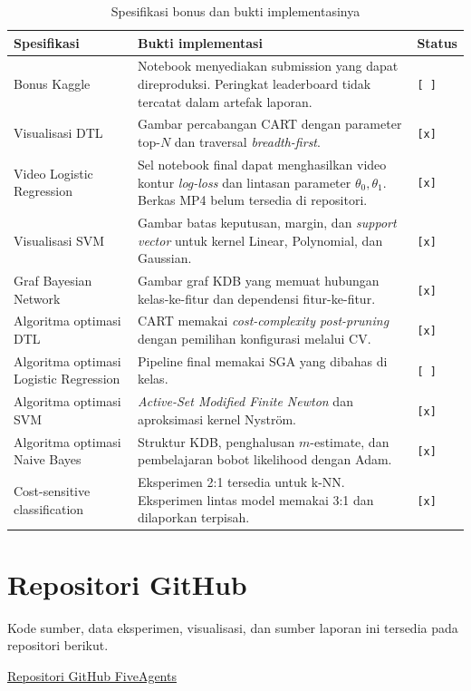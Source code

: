 \begin{table}[H]
    \centering
    \small
    \caption{Spesifikasi bonus dan bukti implementasinya}
    \label{tab:lampiran-bonus-specification-status}
    \begin{tabular}{p{}p{}p{}}
        \toprule
        Spesifikasi                            & Bukti implementasi                                                                                                   & Status       \\
        \midrule
        Bonus Kaggle                           & Notebook menyediakan submission yang dapat direproduksi. Peringkat leaderboard tidak tercatat dalam artefak laporan. & \texttt{[ ]} \\
        Visualisasi DTL                        & Gambar percabangan CART dengan parameter top-$N$ dan traversal \textit{breadth-first}.                               & \texttt{[x]} \\
        Video Logistic Regression              & Sel notebook final dapat menghasilkan video kontur \textit{log-loss} dan lintasan parameter $\theta_0,\theta_1$. Berkas MP4 belum tersedia di repositori. & \texttt{[x]} \\
        Visualisasi SVM                        & Gambar batas keputusan, margin, dan \textit{support vector} untuk kernel Linear, Polynomial, dan Gaussian.           & \texttt{[x]} \\
        Graf Bayesian Network                  & Gambar graf KDB yang memuat hubungan kelas-ke-fitur dan dependensi fitur-ke-fitur.                                   & \texttt{[x]} \\
        Algoritma optimasi DTL                 & CART memakai \textit{cost-complexity post-pruning} dengan pemilihan konfigurasi melalui CV.                          & \texttt{[x]} \\
        Algoritma optimasi Logistic Regression & Pipeline final memakai SGA yang dibahas di kelas.                                                                    & \texttt{[ ]} \\
        Algoritma optimasi SVM                 & \textit{Active-Set Modified Finite Newton} dan aproksimasi kernel Nystr\"om.                                         & \texttt{[x]} \\
        Algoritma optimasi Naive Bayes         & Struktur KDB, penghalusan $m$-estimate, dan pembelajaran bobot likelihood dengan Adam.                               & \texttt{[x]} \\
        Cost-sensitive classification          & Eksperimen 2:1 tersedia untuk k-NN. Eksperimen lintas model memakai 3:1 dan dilaporkan terpisah.                     & \texttt{[x]} \\
        \bottomrule
    \end{tabular}
\end{table}

\section{Repositori GitHub}

Kode sumber, data eksperimen, visualisasi, dan sumber laporan ini tersedia pada repositori berikut.

\begin{center}
    \href{https://github.com/parkuskus/IF3170_G03_FiveAgents}{Repositori GitHub FiveAgents}
\end{center}
